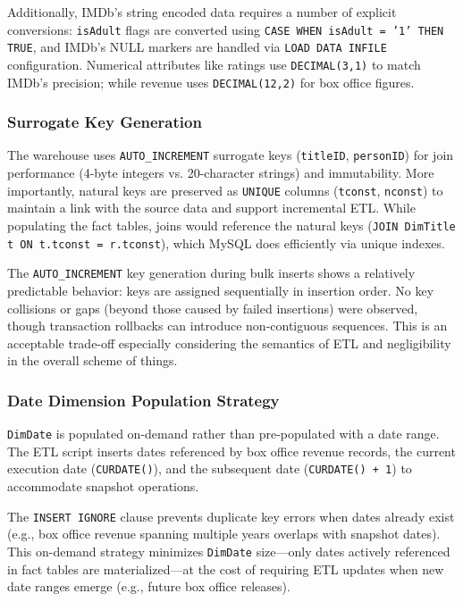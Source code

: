 Additionally, IMDb's string encoded data requires a number of explicit conversions: \texttt{isAdult} flags are converted using \texttt{CASE WHEN isAdult = '1' THEN TRUE}, and IMDb's \texttt{\N} NULL markers are handled via \texttt{LOAD DATA INFILE} configuration. Numerical attributes like ratings use \texttt{DECIMAL(3,1)} to match IMDb's precision; while revenue uses \texttt{DECIMAL(12,2)} for box office figures.

\subsubsection{Surrogate Key Generation}

The warehouse uses \texttt{AUTO\_INCREMENT} surrogate keys (\texttt{titleID}, \texttt{personID}) for join performance (4-byte integers vs. 20-character strings) and immutability. More importantly, natural keys are preserved as \texttt{UNIQUE} columns (\texttt{tconst}, \texttt{nconst}) to maintain a link with the source data and support incremental ETL. While populating the fact tables, joins would reference the natural keys (\texttt{JOIN DimTitle t ON t.tconst = r.tconst}), which MySQL does efficiently via unique indexes.

The \texttt{AUTO\_INCREMENT} key generation during bulk inserts shows a relatively predictable behavior: keys are assigned sequentially in insertion order. No key collisions or gaps (beyond those caused by failed insertions) were observed, though transaction rollbacks can introduce non-contiguous sequences. This is an acceptable trade-off especially considering the semantics of ETL and negligibility in the overall scheme of things.

\subsubsection{Date Dimension Population Strategy}

\texttt{DimDate} is populated on-demand rather than pre-populated with a date range. The ETL script inserts dates referenced by box office revenue records, the current execution date (\texttt{CURDATE()}), and the subsequent date (\texttt{CURDATE() + 1}) to accommodate snapshot operations.

The \texttt{INSERT IGNORE} clause prevents duplicate key errors when dates already exist (e.g., box office revenue spanning multiple years overlaps with snapshot dates). This on-demand strategy minimizes \texttt{DimDate} size—only dates actively referenced in fact tables are materialized—at the cost of requiring ETL updates when new date ranges emerge (e.g., future box office releases).

